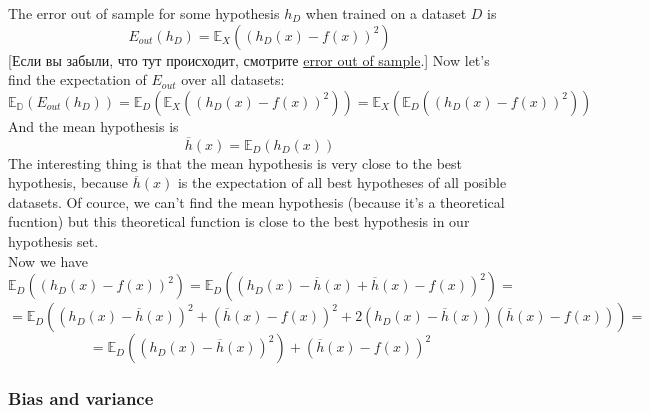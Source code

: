 The error out of sample for some hypothesis $h_D$ when trained on a dataset $D$ is
$$E_{out}(h_D)=\mathbb{E}_X\left(\left(h_D(x)-f(x)\right)^2\right)$$
[Если вы забыли, что тут происходит, смотрите \hyperlink{ein_and_eout}{error out of sample}.] Now let's find the expectation of $E_{out}$ over all datasets:
$$\mathbb{E_D}\left(E_{out}(h_D)\right)=\mathbb{E}_D\left(\mathbb{E}_X\left(\left(h_D(x)-f(x)\right)^2\right)\right)=\mathbb{E}_X\left(\mathbb{E}_D\left(\left(h_D(x)-f(x)\right)^2\right)\right)$$
And the mean hypothesis is
$$\overline{h}(x)=\mathbb{E}_D\left(h_D(x)\right)$$
The interesting thing is that the mean hypothesis is very close to the best hypothesis, because $\overline{h}(x)$ is the expectation of all best hypotheses of all posible datasets. Of cource, we can't find the mean hypothesis (because it's a theoretical fucntion) but this theoretical function is close to the best hypothesis in our hypothesis set.\\
Now we have
$$\mathbb{E}_D\left(\left(h_D(x)-f(x)\right)^2\right)=\mathbb{E}_D\left(\left(h_D(x)-\overline{h}(x)+\overline{h}(x)-f(x)\right)^2\right)=$$
$$=\mathbb{E}_D\left(\left(h_D(x)-\overline{h}(x)\right)^2+\left(\overline{h}(x)-f(x)\right)^2+2\left(h_D(x)-\overline{h}(x)\right)\left(\overline{h}(x)-f(x)\right)\right)=$$
$$=\mathbb{E}_D\left(\left(h_D(x)-\overline{h}(x)\right)^2\right)+\left(\overline{h}(x)-f(x)\right)^2$$

\subsubsection*{Bias and variance}

